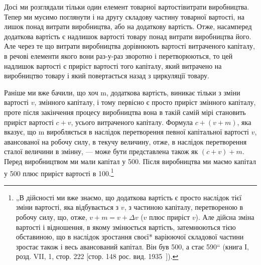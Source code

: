 Досі ми розглядали тільки один елемент товарної вартостівитрати
виробництва. Тепер ми мусимо поглянути і на другу
складову частину товарної вартості, на лишок понад витрати
виробництва, або на додаткову вартість. Отже, насамперед додаткова
вартість є надлишок вартості товару понад витрати виробництва
його. Але через те що витрати виробництва дорівнюють
вартості витраченого капіталу, в речові елементи якого вони
раз-у-раз зворотно і перетворюються, то цей надлишок вартості
є приріст вартості того капіталу, який витрачено на виробництво
товару і який повертається назад з циркуляції товару.

Раніше ми вже бачили, що хоч m, додаткова вартість, виникає
тільки з зміни вартості $v$, змінного капіталу, і тому первісно
є просто приріст змінного капіталу, проте після закінчення
процесу виробництва вона в такій самій мірі становить
приріст вартості $c + v$, усього витраченого капіталу. Формула
$c + (v + m)$, яка вказує, що m виробляється в наслідок перетворення
певної капітальної вартості $v$, авансованої на робочу силу,
в текучу величину, отже, в наслідок перетворення сталої величини
в змінну, — може бути представлена також як $(c + v) + m$.
Перед виробництвом ми мали капітал у 500.
Після виробництва ми маємо капітал у 500
плюс приріст вартості в 100.\footnote{
„В дійсності ми вже знаємо, що додаткова вартість є просто наслідок
тієї зміни вартості, яка відбувається з $v$, з частиною капіталу, перетвореною
в робочу силу, що, отже, $v + m = v + Δv$ ($v$ плюс приріст $v$). Але дійсна зміна
вартості і відношення, в якому змінюється вартість, затемнюються тією обставиною,
що в наслідок зростання своєї* варіюючої складової частини зростає
також і весь авансований капітал. Він був 500, а стає 590“ (книга І, розд.
VII, 1, стор. 222 [стор. 148 рос. вид. 1935~]).
}

